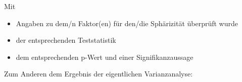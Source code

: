 \documentclass[
]{book}
\newenvironment{Shaded}{\begin{snugshade}}{\end{snugshade}}
\newcommand{\AttributeTok}[1]{\textcolor[rgb]{0.77,0.63,0.00}{#1}}
\newcommand{\NormalTok}[1]{#1}
\newcommand{\SpecialCharTok}[1]{\textcolor[rgb]{0.00,0.00,0.00}{#1}}
\newcommand{\StringTok}[1]{\textcolor[rgb]{0.31,0.60,0.02}{#1}}
\providecommand{\tightlist}{%
  \setlength{\itemsep}{0pt}\setlength{\parskip}{0pt}}
\begin{document}
Mit

\begin{itemize}
\tightlist
\item
  Angaben zu dem/n Faktor(en) für den/die Sphärizität überprüft wurde
\item
  der entsprechenden Teststatistik
\item
  dem entsprechenden p-Wert und einer Signifikanzaussage
\end{itemize}

Zum Anderen dem Ergebnis der eigentlichen Varianzanalyse:

\begin{Shaded}
\end{Shaded}

 
  \providecommand{\huxb}[2]{\arrayrulecolor[RGB]{#1}\global\arrayrulewidth=#2pt}
  \providecommand{\huxvb}[2]{\color[RGB]{#1}\vrule width #2pt}
  \providecommand{\huxtpad}[1]{\rule{0pt}{#1}}
  \providecommand{\huxbpad}[1]{\rule[-#1]{0pt}{#1}}
\end{document}
